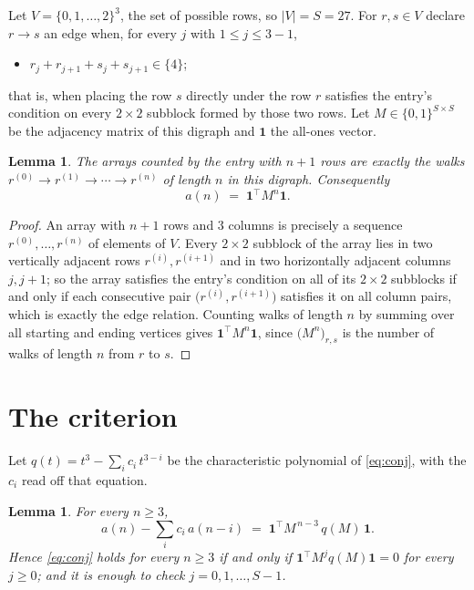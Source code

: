 \documentclass[11pt,a4paper]{article}
\theoremstyle{plain}
\newtheorem{lemma}[theorem]{Lemma}
\theoremstyle{definition}
\begin{document}
Let $V=\{0,1,\dots,2\}^{3}$, the set of possible rows, so $|V|=S=27$. For
$r,s\in V$ declare $r\to s$ an edge when, for every $j$ with $1\le j\le 3-1$,
\begin{itemize}
\item $r_j+r_{j+1}+s_j+s_{j+1}\in\{4\}$;

\end{itemize}
that is, when placing the row $s$ directly under the row $r$ satisfies the entry's
condition on every $2\times2$ subblock formed by those two rows. Let $M\in\{0,1\}^{S\times
S}$ be the adjacency matrix of this digraph and $\mathbf{1}$ the all-ones vector.

\begin{lemma}\label{lem:walk}
The arrays counted by the entry with $n+1$ rows are exactly the walks
$r^{(0)}\to r^{(1)}\to\cdots\to r^{(n)}$ of length $n$ in this digraph. Consequently
\[
a(n)\;=\;\mathbf{1}^{\!\top}M^{n}\mathbf{1} .
\]
\end{lemma}

\begin{proof}
An array with $n+1$ rows and $3$ columns is precisely a sequence
$r^{(0)},\dots,r^{(n)}$ of elements of $V$. Every $2\times2$ subblock of the array lies
in two vertically adjacent rows $r^{(i)},r^{(i+1)}$ and in two horizontally adjacent
columns $j,j+1$; so the array satisfies the entry's condition on all of its $2\times2$
subblocks if and only if each consecutive pair $\bigl(r^{(i)},r^{(i+1)}\bigr)$ satisfies
it on all column pairs, which is exactly the edge relation. Counting walks of length $n$ by
summing over all starting and ending vertices gives
$\mathbf{1}^{\!\top}M^{n}\mathbf{1}$, since
$\bigl(M^{n}\bigr)_{r,s}$ is the number of walks of length $n$ from $r$ to $s$.
\end{proof}

\section{The criterion}

Let $q(t)=t^{3}-\sum_{i}c_i\,t^{3-i}$ be the characteristic polynomial of
\eqref{eq:conj}, with the $c_i$ read off that equation.

\begin{lemma}\label{lem:crit}
For every $n\ge3$,
\[
a(n)-\sum_i c_i\,a(n-i)\;=\;\mathbf{1}^{\!\top}M^{\,n-3}\,q(M)\,\mathbf{1} .
\]
Hence \eqref{eq:conj} holds for every $n\ge3$ if and only if
$\mathbf{1}^{\!\top}M^{j}q(M)\mathbf{1}=0$ for every $j\ge0$; and it is enough to
check $j=0,1,\dots,S-1$.
\end{lemma}
\end{document}
